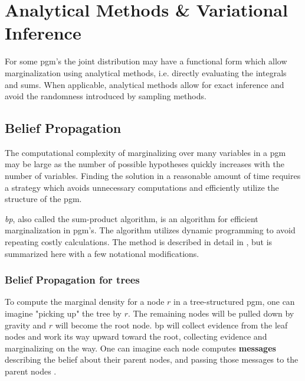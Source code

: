 \chapter{Analytical Methods \& Variational Inference}\label{chap:analytical}
For some \acrshort{pgm}'s the joint distribution may have a functional form which allow marginalization using analytical methods, i.e. directly evaluating the integrals and sums. When applicable, analytical methods allow for exact inference and avoid the randomness introduced by sampling methods. %


\section{Belief Propagation}
The computational complexity of marginalizing over many variables in a \acrshort{pgm} may be large as the number of possible hypotheses quickly increases with the number of variables. Finding the solution in a reasonable amount of time requires a strategy which avoids unnecessary computations and efficiently utilize the structure of the \acrshort{pgm}. 

\textit{\acrfull{bp}}, also called the sum-product algorithm, is an algorithm for efficient marginalization in \acrshort{pgm}'s. The algorithm utilizes dynamic programming to avoid repeating costly calculations. The method is described in detail in \cite[p .~710]{murphy}, but is summarized here with a few notational modifications. 


\subsection{Belief Propagation for trees}
To compute the marginal density for a node $r$ in a tree-structured \acrshort{pgm}, one can imagine "picking up" the tree by $r$. The remaining nodes will be pulled down by gravity and $r$ will become the root node. \acrshort{bp} will collect evidence from the leaf nodes and work its way upward toward the root, collecting evidence and marginalizing on the way. One can imagine each node computes \textbf{messages} describing the belief about their parent nodes, and passing those messages to the parent nodes \cite{murphy}.
